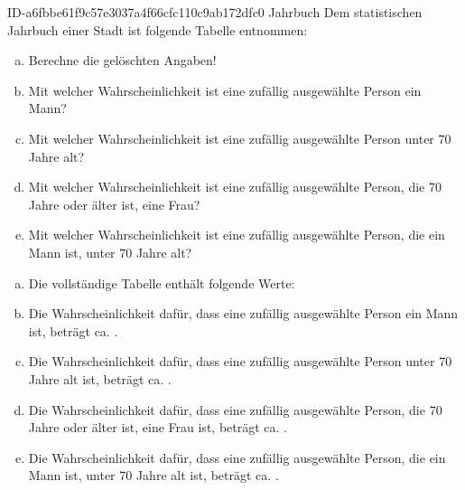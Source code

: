 \begin{exercise}
      {ID-a6fbbe61f9c57e3037a4f66cfc110c9ab172dfc0}
      {Jahrbuch}
  \ifproblem\problem
    Dem statistischen Jahrbuch einer Stadt ist folgende Tabelle entnommen:
    \begin{center}
      \begin{fourfoldtable}
      \end{fourfoldtable}
    \end{center}
    \begin{enumerate}[a)]
      \item Berechne die gelöschten Angaben!
      \item Mit welcher Wahrscheinlichkeit ist eine zufällig ausgewählte
            Person ein Mann?
      \item Mit welcher Wahrscheinlichkeit ist eine zufällig ausgewählte
            Person unter 70 Jahre alt?
      \item Mit welcher Wahrscheinlichkeit ist eine zufällig ausgewählte
            Person, die 70 Jahre oder älter ist, eine Frau?
      \item Mit welcher Wahrscheinlichkeit ist eine zufällig ausgewählte
            Person, die ein Mann ist, unter 70 Jahre alt?
    \end{enumerate}
  \fi
  \ifoutcome\outcome
    \begin{enumerate}[a)]
      \item Die vollständige Tabelle enthält folgende Werte:
            \begin{center}
              \begin{fourfoldtable}
              \end{fourfoldtable}
            \end{center}
      \item Die Wahrscheinlichkeit dafür, dass eine zufällig ausgewählte
            Person ein Mann ist, beträgt ca. .
      \item Die Wahrscheinlichkeit dafür, dass eine zufällig ausgewählte
            Person unter 70 Jahre alt ist, beträgt ca. .
      \item Die Wahrscheinlichkeit dafür, dass eine zufällig ausgewählte
            Person, die 70 Jahre oder älter ist, eine Frau ist, beträgt
            ca. .
      \item Die Wahrscheinlichkeit dafür, dass eine zufällig ausgewählte
            Person, die ein Mann ist, unter 70 Jahre alt ist, beträgt
            ca. .
    \end{enumerate}
  \fi
\end{exercise}
